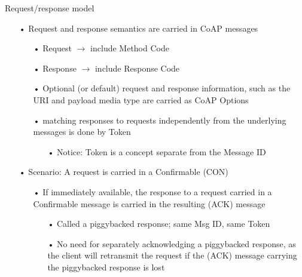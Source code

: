 \documentclass[11pt]{beamer}
\begin{document}
\begin{frame}{Request/response model}
\begin{itemize}
\item[•] Request and response semantics are carried in CoAP messages
\begin{itemize}
\item[•] Request $\rightarrow$ include Method Code
\item[•] Response $\rightarrow$ include Response Code
\item[•] Optional (or default) request and response information, such as the URI and payload media type are carried as CoAP Options
\item[•] matching responses to requests independently from the underlying messages is done by Token
\begin{itemize}
\item[•] Notice: Token is a concept separate from the Message ID
\end{itemize}
\end{itemize}
\item[•] Scenario: A request is carried in a Confirmable (CON) 
\begin{itemize}
\item[•] If immediately available, the response to a request carried in a Confirmable message is carried in the resulting (ACK) message
\begin{itemize}
\item[•] Called a piggybacked response; same Msg ID, same Token
\item[•] No need for separately acknowledging a piggybacked response, as the client will retransmit the request if the (ACK) message carrying the piggybacked response is lost
\end{itemize}
\end{itemize}
\end{itemize}
\end{frame}
\end{document}
